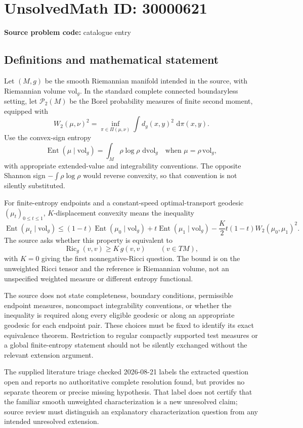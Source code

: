 \documentclass[11pt]{article}
\newcommand{\dd}{\,\mathrm{d}}
\begin{document}
\section*{UnsolvedMath ID: 30000621}
\textbf{Source problem code:} catalogue entry
\subsection{Definitions and mathematical statement}
Let \((M,g)\) be the smooth Riemannian manifold intended in the source, with Riemannian volume \(\mathrm{vol}_g\). In the standard complete connected boundaryless setting, let \(\mathcal P_2(M)\) be the Borel probability measures of finite second moment, equipped with
\[
W_2(\mu,\nu)^2=\inf_{\pi\in\Pi(\mu,\nu)}\int d_g(x,y)^2\,\dd\pi(x,y).
\]
Use the convex-sign entropy
\[
\operatorname{Ent}(\mu\mid\mathrm{vol}_g)=\int_M\rho\log\rho\,\dd\mathrm{vol}_g
\quad\text{when }\mu=\rho\,\mathrm{vol}_g,
\]
with appropriate extended-value and integrability conventions. The opposite Shannon sign \(-\int\rho\log\rho\) would reverse convexity, so that convention is not silently substituted.

For finite-entropy endpoints and a constant-speed optimal-transport geodesic \((\mu_t)_{0\leq t\leq1}\), \(K\)-displacement convexity means the inequality
\[
\operatorname{Ent}(\mu_t\mid\mathrm{vol}_g)
\leq(1-t)\operatorname{Ent}(\mu_0\mid\mathrm{vol}_g)
+t\operatorname{Ent}(\mu_1\mid\mathrm{vol}_g)
-\frac K2t(1-t)W_2(\mu_0,\mu_1)^2.
\]
The source asks whether this property is equivalent to
\[
\operatorname{Ric}_g(v,v)\geq K\,g(v,v)\qquad(v\in TM),
\]
with \(K=0\) giving the first nonnegative-Ricci question. The bound is on the unweighted Ricci tensor and the reference is Riemannian volume, not an unspecified weighted measure or different entropy functional.

The source does not state completeness, boundary conditions, permissible endpoint measures, noncompact integrability conventions, or whether the inequality is required along every eligible geodesic or along an appropriate geodesic for each endpoint pair. These choices must be fixed to identify its exact equivalence theorem. Restriction to regular compactly supported test measures or a global finite-entropy statement should not be silently exchanged without the relevant extension argument.

The supplied literature triage checked 2026-08-21 labels the extracted question open and reports no authoritative complete resolution found, but provides no separate theorem or precise missing hypothesis. That label does not certify that the familiar smooth unweighted characterization is a new unresolved claim; source review must distinguish an explanatory characterization question from any intended unresolved extension.
\end{document}

